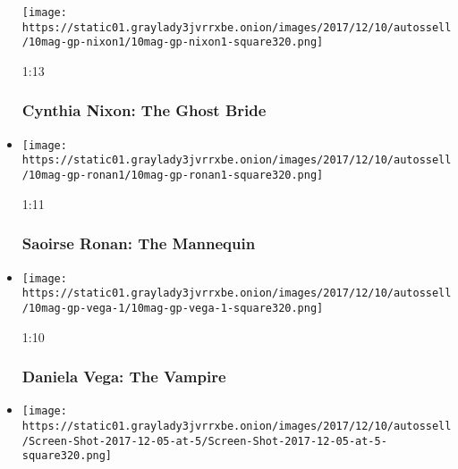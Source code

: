 \begin{itemize}
  \texttt{[image: https://static01.graylady3jvrrxbe.onion/images/2017/12/10/autossell/10mag-gp-nixon1/10mag-gp-nixon1-square320.png]}

  1:13

  \hypertarget{cynthia-nixon-the-ghost-bride}{%
  \subsubsection{Cynthia Nixon: The Ghost
  Bride}\label{cynthia-nixon-the-ghost-bride}}
\item
  \href{https://www.nytimes3xbfgragh.onion/video/magazine/100000005588911/the-mannequin.html?action=click\&module=video-series-bar\&region=header\&pgtype=Article\&playlistId=video/magazine}{}

  \texttt{[image: https://static01.graylady3jvrrxbe.onion/images/2017/12/10/autossell/10mag-gp-ronan1/10mag-gp-ronan1-square320.png]}

  1:11

  \hypertarget{saoirse-ronan-the-mannequin}{%
  \subsubsection{Saoirse Ronan: The
  Mannequin}\label{saoirse-ronan-the-mannequin}}
\item
  \href{https://www.nytimes3xbfgragh.onion/video/magazine/100000005588930/daniela-vega-the-vampire.html?action=click\&module=video-series-bar\&region=header\&pgtype=Article\&playlistId=video/magazine}{}

  \texttt{[image: https://static01.graylady3jvrrxbe.onion/images/2017/12/10/autossell/10mag-gp-vega-1/10mag-gp-vega-1-square320.png]}

  1:10

  \hypertarget{daniela-vega-the-vampire}{%
  \subsubsection{Daniela Vega: The
  Vampire}\label{daniela-vega-the-vampire}}
\item
  \href{https://www.nytimes3xbfgragh.onion/video/magazine/100000005588908/brooklynn-prince-the-demon-child.html?action=click\&module=video-series-bar\&region=header\&pgtype=Article\&playlistId=video/magazine}{}

  \texttt{[image: https://static01.graylady3jvrrxbe.onion/images/2017/12/10/autossell/Screen-Shot-2017-12-05-at-5/Screen-Shot-2017-12-05-at-5-square320.png]}


\end{itemize}

